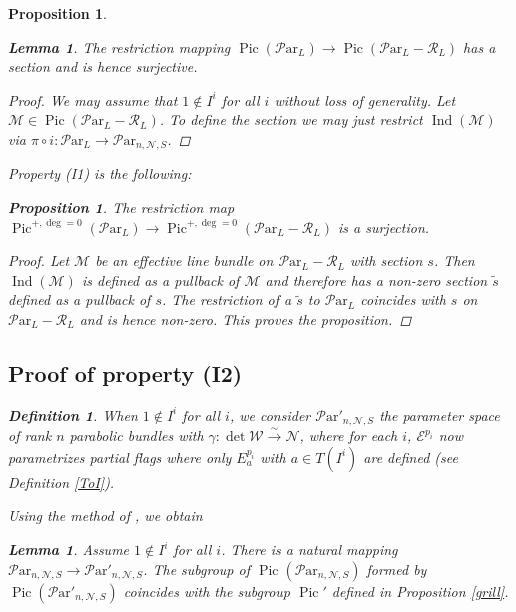 \documentclass[11pt]{amsart}
\newcommand\op{\operatorname}
\newcommand\Pic{\operatorname{Pic}}
\newcommand\me{\mathcal{E}}
\newcommand\mw{\mathcal{W}}
\newcommand\mn{\mathcal{N}}
\newcommand\ParL{\mathcal{P}\text{ar}_L}
\newcommand\Par{\mathcal{P}\text{ar} }
\newcommand{\leto}[1]{\stackrel{#1}{\to}}
\newtheorem{proposition}[theorem]{Proposition}
\newtheorem{lemma}[theorem]{Lemma}
\newtheorem{defi}[theorem]{Definition}
\numberwithin{theorem}{subsection}
\begin{document}
{\begin{proposition}
\begin{lemma}\label{prius2}
The restriction mapping $\Pic(\ParL)\to \Pic(\ParL -\mathcal{R}_L)$ has a section and is hence surjective.
\end{lemma}
\begin{proof}
We may assume that $1\not\in I^i$ for all $i$ without loss of generality. Let $\mathcal{M}\in\Pic(\ParL -\mathcal{R}_L)$. To define the section we may just restrict
$\op{Ind}(\mathcal{M})$  via $\pi\circ i:\ParL \to \Par_{n,\mn,S}$.
\end{proof}
Property (I1) is the following:
\begin{proposition}\label{M11}
The restriction map $\Pic^{+,\deg=0}(\ParL)\to \Pic^{+,\deg=0}(\ParL -\mathcal{R}_L)$ is a surjection.
\end{proposition}
\begin{proof}
Let $\mathcal{M}$ be an effective line bundle on $\ParL -\mathcal{R}_L$ with section $s$. Then $\op{Ind}(\mathcal{M})$ is defined as a pullback of $\mathcal{M}$ and   therefore has a non-zero section $\tilde{s}$ defined as a pullback of $s$. The restriction of a $\tilde{s}$  to $\ParL$ coincides with $s$ on $\ParL -\mathcal{R}_L$ and is hence non-zero. This proves the proposition.
\end{proof}



\subsection{Proof of property (I2)}

\begin{defi}  When $1\not\in I^i$ for all $i$, we consider $\Par'_{n,\mn,S}$ the parameter space of rank $n$ parabolic bundles with $\gamma:\det \mw\leto{\sim}\mn$, where for each $i$,  $\me^{p_i}$ now parametrizes {\em partial flags} where only $E^{p_i}_a$ with $a\in T(I^i)$ are defined (see Definition  \ref{ToI}).
\end{defi}
Using  the method of \cite{LS}, we obtain
\begin{lemma}
 Assume $1\not\in I^i$ for all $i$. There is a natural mapping $\Par_{n,\mn,S}\to \Par'_{n,\mn,S}$.
The subgroup of $\Pic(\Par_{n,\mn,S})$ formed by $\Pic(\Par'_{n,\mn,S})$ coincides with the subgroup
$\Pic'$ defined in Proposition \ref{grill}.
\end{lemma}


\end{proposition}}
\end{document}
